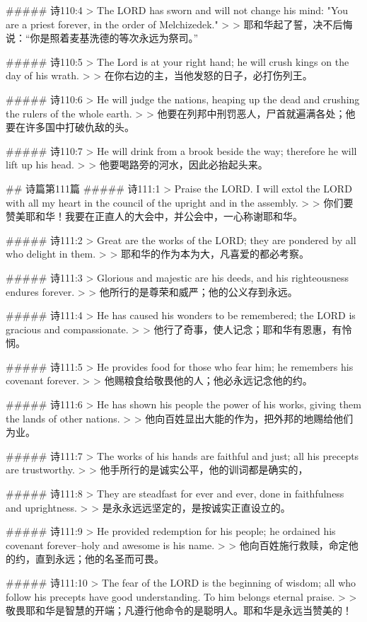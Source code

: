 ##### 诗110:4
> The LORD has sworn and will not change his mind: "You are a priest forever, in the order of Melchizedek."
>
> 耶和华起了誓，决不后悔说：“你是照着麦基洗德的等次永远为祭司。”


##### 诗110:5
> The Lord is at your right hand; he will crush kings on the day of his wrath.
>
> 在你右边的主，当他发怒的日子，必打伤列王。


##### 诗110:6
> He will judge the nations, heaping up the dead and crushing the rulers of the whole earth.
>
> 他要在列邦中刑罚恶人，尸首就遍满各处；他要在许多国中打破仇敌的头。


##### 诗110:7
> He will drink from a brook beside the way; therefore he will lift up his head.
>
> 他要喝路旁的河水，因此必抬起头来。


## 诗篇第111篇
##### 诗111:1
> Praise the LORD. I will extol the LORD with all my heart in the council of the upright and in the assembly.
>
> 你们要赞美耶和华！我要在正直人的大会中，并公会中，一心称谢耶和华。


##### 诗111:2
> Great are the works of the LORD; they are pondered by all who delight in them.
>
> 耶和华的作为本为大，凡喜爱的都必考察。


##### 诗111:3
> Glorious and majestic are his deeds, and his righteousness endures forever.
>
> 他所行的是尊荣和威严；他的公义存到永远。


##### 诗111:4
> He has caused his wonders to be remembered; the LORD is gracious and compassionate.
>
> 他行了奇事，使人记念；耶和华有恩惠，有怜悯。


##### 诗111:5
> He provides food for those who fear him; he remembers his covenant forever.
>
> 他赐粮食给敬畏他的人；他必永远记念他的约。


##### 诗111:6
> He has shown his people the power of his works, giving them the lands of other nations.
>
> 他向百姓显出大能的作为，把外邦的地赐给他们为业。


##### 诗111:7
> The works of his hands are faithful and just; all his precepts are trustworthy.
>
> 他手所行的是诚实公平，他的训词都是确实的，


##### 诗111:8
> They are steadfast for ever and ever, done in faithfulness and uprightness.
>
> 是永永远远坚定的，是按诚实正直设立的。


##### 诗111:9
> He provided redemption for his people; he ordained his covenant forever--holy and awesome is his name.
>
> 他向百姓施行救赎，命定他的约，直到永远；他的名圣而可畏。


##### 诗111:10
> The fear of the LORD is the beginning of wisdom; all who follow his precepts have good understanding. To him belongs eternal praise.
>
> 敬畏耶和华是智慧的开端；凡遵行他命令的是聪明人。耶和华是永远当赞美的！


